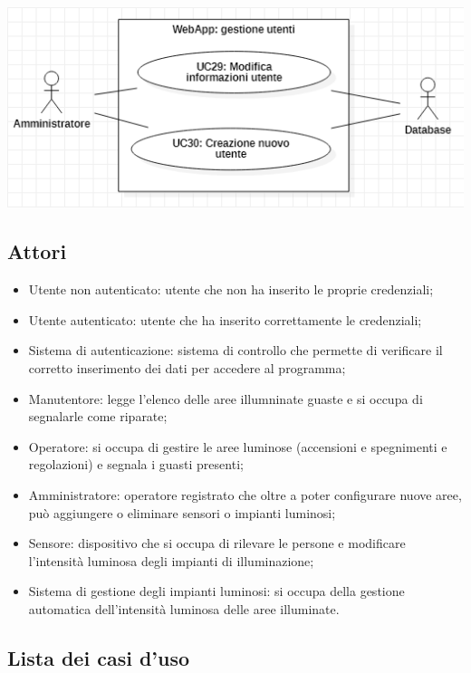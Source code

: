 \documentclass[a4paper, 12pt]{article}
\begin{document}
\includegraphics[scale=0.7]{diagramma_use_case_13.png}

\subsection{Attori}
\begin{itemize}
    \item Utente non autenticato: utente che non ha inserito le proprie credenziali;
    \item Utente autenticato: utente che ha inserito correttamente le credenziali;
    \item Sistema di autenticazione: sistema di controllo che permette di verificare il corretto inserimento dei dati per accedere al programma;
    \item Manutentore: legge l'elenco delle aree illumninate guaste e si occupa di segnalarle come riparate;
    \item Operatore: si occupa di gestire le aree luminose (accensioni e spegnimenti e regolazioni) e segnala i guasti presenti;
    \item Amministratore: operatore registrato che oltre a poter configurare nuove aree, può aggiungere o eliminare sensori o impianti luminosi;
    \item Sensore: dispositivo che si occupa di rilevare le persone e modificare l'intensità luminosa degli impianti di illuminazione;
    \item Sistema di gestione degli impianti luminosi: si occupa della gestione automatica dell'intensità luminosa delle aree illuminate.
\end{itemize}

\subsection{Lista dei casi d'uso}
\end{document}
